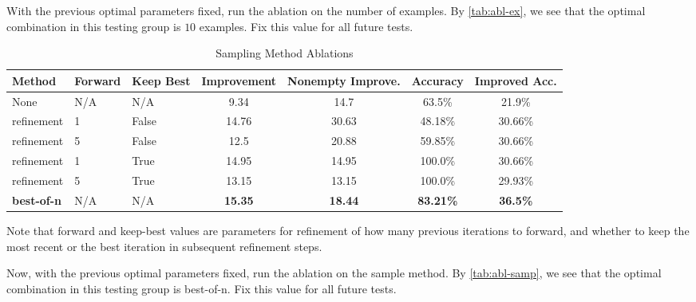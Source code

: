  With the previous optimal parameters fixed, run the ablation on the number of examples. By \autoref{tab:abl-ex}, we see that the optimal combination in this testing group is $10$ examples. Fix this value for all future tests.





\begin{table}[h]
\caption{Sampling Method Ablations}
\label{tab:abl-samp}
\centering
\small
\begin{tabular}{lll|cccc}
\toprule
Method & Forward & Keep Best & Improvement& Nonempty Improve.& Accuracy & Improved Acc.\\
\midrule
None &N/A & N/A&  9.34 & 14.7 & 63.5\% & 21.9\% \\
refinement&1&False &  14.76 & 30.63 & 48.18\% & 30.66\% \\
refinement&5 &False &  12.5 & 20.88 & 59.85\% & 30.66\% \\
refinement&1 &True &  14.95 & 14.95 & 100.0\% & 30.66\% \\
refinement&5 &True &  13.15 & 13.15 & 100.0\% & 29.93\% \\
\textbf{best-of-n} &N/A&N/A&  \textbf{15.35} & \textbf{18.44} & \textbf{83.21\%} & \textbf{36.5\%} \\
\bottomrule
\end{tabular}
\end{table}


Note that forward and keep-best values are parameters for refinement of how many previous iterations to forward, and whether to keep the most recent or the best iteration in subsequent refinement steps. 



Now, with the previous optimal parameters fixed, run the ablation on the sample method. By \autoref{tab:abl-samp}, we see that the optimal combination in this testing group is best-of-n. Fix this value for all future tests.




